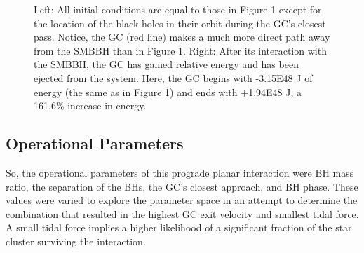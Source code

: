 \documentclass{aastex62}
\begin{document}
\begin{figure}

\caption{Left: All initial conditions are equal to those in Figure 1 except for the location of the black holes in their orbit during the GC's closest pass. Notice, the GC (red line) makes a much more direct path away from the SMBBH than in Figure 1. Right: After its interaction with the SMBBH, the GC has gained relative energy and has been ejected from the system. Here, the GC begins with -3.15E48 J of energy (the same as in Figure 1) and ends with +1.94E48 J, a 161.6\% increase in energy.}
\end{figure}
\subsection{Operational Parameters}
So, the operational parameters of this prograde planar interaction were BH mass ratio, the separation of the BHs, the GC's closest approach, and BH phase. These values were varied to explore the parameter space in an attempt to determine the combination that resulted in the highest GC exit velocity and smallest tidal force. A small tidal force implies a higher likelihood of a significant fraction of the star cluster surviving the interaction. 
\end{document}
